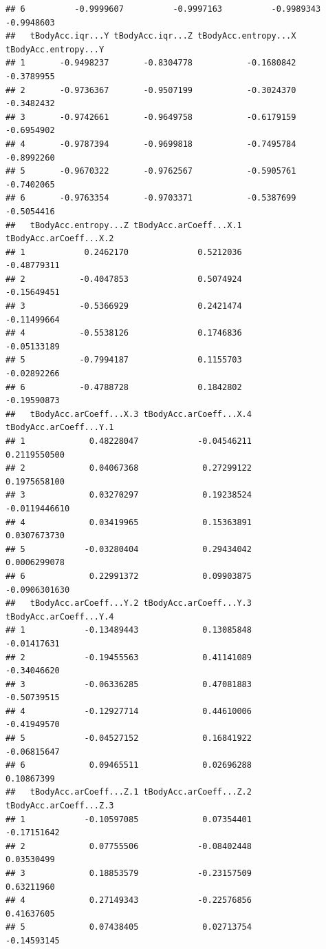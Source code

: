 \documentclass[
]{article}
\begin{document}
\begin{verbatim}
## 6          -0.9999607          -0.9997163          -0.9989343       -0.9948603
##   tBodyAcc.iqr...Y tBodyAcc.iqr...Z tBodyAcc.entropy...X tBodyAcc.entropy...Y
## 1       -0.9498237       -0.8304778           -0.1680842           -0.3789955
## 2       -0.9736367       -0.9507199           -0.3024370           -0.3482432
## 3       -0.9742661       -0.9649758           -0.6179159           -0.6954902
## 4       -0.9787394       -0.9699818           -0.7495784           -0.8992260
## 5       -0.9670322       -0.9762567           -0.5905761           -0.7402065
## 6       -0.9763354       -0.9703371           -0.5387699           -0.5054416
##   tBodyAcc.entropy...Z tBodyAcc.arCoeff...X.1 tBodyAcc.arCoeff...X.2
## 1            0.2462170              0.5212036            -0.48779311
## 2           -0.4047853              0.5074924            -0.15649451
## 3           -0.5366929              0.2421474            -0.11499664
## 4           -0.5538126              0.1746836            -0.05133189
## 5           -0.7994187              0.1155703            -0.02892266
## 6           -0.4788728              0.1842802            -0.19590873
##   tBodyAcc.arCoeff...X.3 tBodyAcc.arCoeff...X.4 tBodyAcc.arCoeff...Y.1
## 1             0.48228047            -0.04546211           0.2119550500
## 2             0.04067368             0.27299122           0.1975658100
## 3             0.03270297             0.19238524          -0.0119446610
## 4             0.03419965             0.15363891           0.0307673730
## 5            -0.03280404             0.29434042           0.0006299078
## 6             0.22991372             0.09903875          -0.0906301630
##   tBodyAcc.arCoeff...Y.2 tBodyAcc.arCoeff...Y.3 tBodyAcc.arCoeff...Y.4
## 1            -0.13489443             0.13085848            -0.01417631
## 2            -0.19455563             0.41141089            -0.34046620
## 3            -0.06336285             0.47081883            -0.50739515
## 4            -0.12927714             0.44610006            -0.41949570
## 5            -0.04527152             0.16841922            -0.06815647
## 6             0.09465511             0.02696288             0.10867399
##   tBodyAcc.arCoeff...Z.1 tBodyAcc.arCoeff...Z.2 tBodyAcc.arCoeff...Z.3
## 1            -0.10597085             0.07354401            -0.17151642
## 2             0.07755506            -0.08402448             0.03530499
## 3             0.18853579            -0.23157509             0.63211960
## 4             0.27149343            -0.22576856             0.41637605
## 5             0.07438405             0.02713754            -0.14593145

\end{verbatim}
\end{document}
